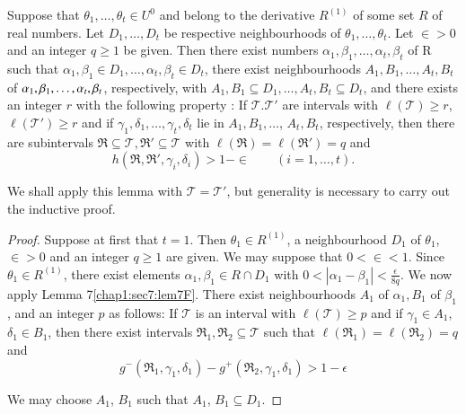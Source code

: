 \begin{lemma}\label{chap1:sec7:lem7G}
Suppose that $\theta_{1}, \ldots, \theta_{t} \in U^{0}$ and
belong to the derivative $R^{(1)}$ of some set $R$ of real
numbers. Let $D_{1}, \ldots, D_{t}$ be respective neighbourhoods of
$\theta_{1}, \ldots, \theta_{t}$. Let $\in > 0$ and an integer
$q \geq 1$ be given. Then there exist numbers $\alpha_{1}, \beta_{1},
\ldots, \alpha_{t}, \beta_{t}$ of R such that $\alpha_{1}, \beta_{1}
\in D_{1}, \ldots, \alpha_{t}, \beta_{t} \in D_{t}$, there
exist neighbourhoods $A_{1}, B_{1}, \ldots, A_{t}, B_{t}$ of
$\alpha_{1},\break \beta_{1}, \ldots, \alpha_{t}, \beta_{t}$, respectively,
with $A_{1}, B_{1} \subseteq D_{1}, \ldots, A_{t}, B_{t} \subseteq
D_{t}$, and there exists an integer $r$ with the following property :
If $\mathscr{T}.\mathscr{T}'$ are intervals with $\ell
(\mathscr{T}) \geq r$, $\ell (\mathscr{T}') \geq r$ and if
$\gamma_{1}, \delta_{1}, \ldots, \gamma_{t}, \delta_{t}$ lie in
$A_{1}, B_{1}, \ldots$, $A_{t}, B_{t}$, respectively, then there are
subintervals $\mathfrak{R} \subseteq \mathscr{T}, \mathfrak{R}'
\subseteq \mathscr{T}$ with $\ell (\mathfrak{R}) = \ell
(\mathfrak{R}') = q$ and
$$
h(\mathfrak{R}, \mathfrak{R}', \gamma_{i}, \delta_{i}) > 1 - \in
\qquad (i = 1, \ldots, t).
$$
\end{lemma}

We shall apply this lemma with $\mathscr{T} = \mathscr{T}'$, but
generality is necessary to carry out the inductive proof.

\begin{proof} 
Suppose at first that $t =
1$. Then $\theta_{1} \in R^{(1)}$, a neighbourhood $D_{1}$ of
$\theta_{1}$, $\in > 0$ and an integer $q \geq 1$ are given. We
may suppose that $0 < \in < 1$. Since $\theta_{1} \in
R^{(1)}$, there exist elements $\alpha_{1}, \beta_{1} \in R \cap
D_{1}$ with $0 < |\alpha_{1} - \beta_{1}| < \frac{\epsilon}{8q}$. We
now apply Lemma 7\ref{chap1:sec7:lem7F}. There exist neighbourhoods $A_{1}$ of
$\alpha_{1}, B_{1}$ of $\beta_{1}$, and an integer $p$ as follows: If
$\mathscr{T}$ is an interval with $\ell(\mathscr{T}) \geq p$ and if
$\gamma_{1} \in A_{1}$, $\delta_{1} \in B_{1}$, then there
exist intervals $\mathfrak{R}_{1}, \mathfrak{R}_{2} \subseteq
\mathscr{T}$ such that $\ell (\mathfrak{R}_{1}) = \ell
(\mathfrak{R}_{2}) = q$ and
\begin{equation*}
g^{-} (\mathfrak{R}_{1}, \gamma_{1}, \delta_{1}) - g^{+}
(\mathfrak{R}_{2}, \gamma_{1}, \delta_{1}) > 1 - \epsilon\tag{7.8}\label{chap1:sec7:eq7.8}
\end{equation*}

We may choose $A_{1}$, $B_{1}$ such that $A_{1}$, $B_{1} \subseteq
D_{1}$.
\end{proof}

